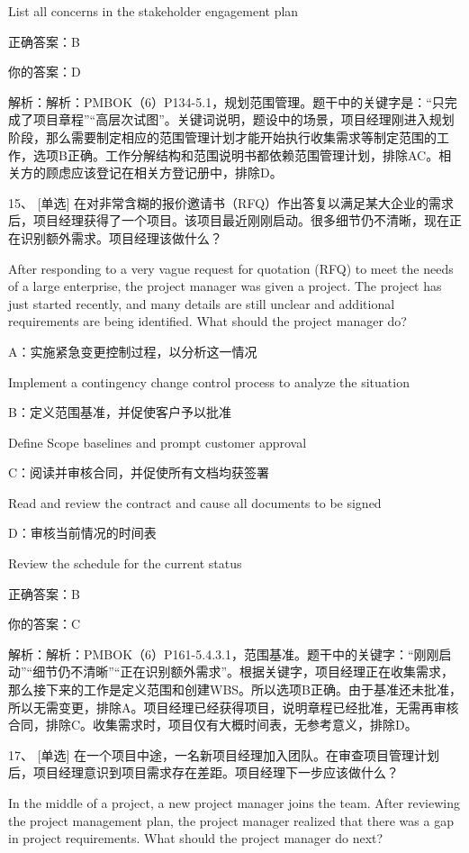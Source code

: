 List all concerns in the stakeholder engagement plan

正确答案：B

你的答案：D

解析：解析：PMBOK（6）P134-5.1，规划范围管理。题干中的关键字是：“只完成了项目章程”“高层次试图”。关键词说明，题设中的场景，项目经理刚进入规划阶段，那么需要制定相应的范围管理计划才能开始执行收集需求等制定范围的工作，选项B正确。工作分解结构和范围说明书都依赖范围管理计划，排除AC。相关方的顾虑应该登记在相关方登记册中，排除D。



15、 [单选] 在对非常含糊的报价邀请书（RFQ）作出答复以满足某大企业的需求后，项目经理获得了一个项目。该项目最近刚刚启动。很多细节仍不清晰，现在正在识别额外需求。项目经理该做什么？

After responding to a very vague request for quotation (RFQ) to meet the needs of a large enterprise, the project manager was given a project. The project has just started recently, and many details are still unclear and additional requirements are being identified. What should the project manager do?

A：实施紧急变更控制过程，以分析这一情况

Implement a contingency change control process to analyze the situation

B：定义范围基准，并促使客户予以批准

Define Scope baselines and prompt customer approval

C：阅读并审核合同，并促使所有文档均获签署

Read and review the contract and cause all documents to be signed

D：审核当前情况的时间表

Review the schedule for the current status

正确答案：B

你的答案：C

解析：解析：PMBOK（6）P161-5.4.3.1，范围基准。题干中的关键字：“刚刚启动”“细节仍不清晰”“正在识别额外需求”。根据关键字，项目经理正在收集需求，那么接下来的工作是定义范围和创建WBS。所以选项B正确。由于基准还未批准，所以无需变更，排除A。项目经理已经获得项目，说明章程已经批准，无需再审核合同，排除C。收集需求时，项目仅有大概时间表，无参考意义，排除D。



17、 [单选] 在一个项目中途，一名新项目经理加入团队。在审查项目管理计划后，项目经理意识到项目需求存在差距。项目经理下一步应该做什么？

In the middle of a project, a new project manager joins the team. After reviewing the project management plan, the project manager realized that there was a gap in project requirements. What should the project manager do next?

